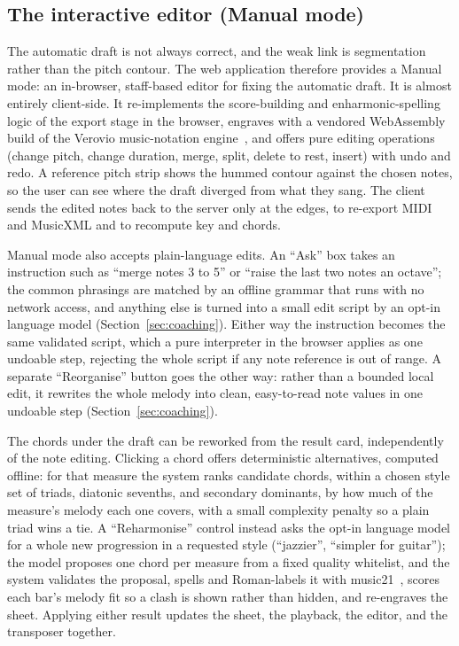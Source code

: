 \documentclass[12pt,a4paper]{article}
\begin{document}
\subsection{The interactive editor (Manual mode)}

The automatic draft is not always correct, and the weak link is segmentation
rather than the pitch contour. The web application therefore provides a Manual
mode: an in-browser, staff-based editor for fixing the automatic draft. It is
almost entirely client-side. It re-implements the score-building and
enharmonic-spelling logic of the export stage in the browser, engraves with a
vendored WebAssembly build of the Verovio music-notation
engine~\cite{verovio}, and offers pure editing operations (change pitch, change
duration, merge, split, delete to rest, insert) with undo and redo. A reference
pitch strip shows the hummed contour against the chosen notes, so the user can
see where the draft diverged from what they sang. The client sends the edited
notes back to the server only at the edges, to re-export MIDI and MusicXML and
to recompute key and chords.

Manual mode also accepts plain-language edits. An ``Ask'' box takes an
instruction such as ``merge notes 3 to 5'' or ``raise the last two notes an
octave''; the common phrasings are matched by an offline grammar that runs with
no network access, and anything else is turned into a small edit script by an
opt-in language model (Section~\ref{sec:coaching}). Either way the instruction
becomes the same validated script, which a pure interpreter in the browser
applies as one undoable step, rejecting the whole script if any note reference is
out of range. A separate ``Reorganise'' button goes the other way: rather than a
bounded local edit, it rewrites the whole melody into clean, easy-to-read note
values in one undoable step (Section~\ref{sec:coaching}).

The chords under the draft can be reworked from the result card, independently of
the note editing. Clicking a chord offers deterministic alternatives, computed
offline: for that measure the system ranks candidate chords, within a chosen
style set of triads, diatonic sevenths, and secondary dominants, by how much of
the measure's melody each one covers, with a small complexity penalty so a plain
triad wins a tie. A ``Reharmonise'' control instead asks the opt-in language
model for a whole new progression in a requested style (``jazzier'', ``simpler
for guitar''); the model proposes one chord per measure from a fixed quality
whitelist, and the system validates the proposal, spells and Roman-labels it with
music21~\cite{music21}, scores each bar's melody fit so a clash is shown rather
than hidden, and re-engraves the sheet. Applying either result updates the sheet,
the playback, the editor, and the transposer together.
\end{document}
